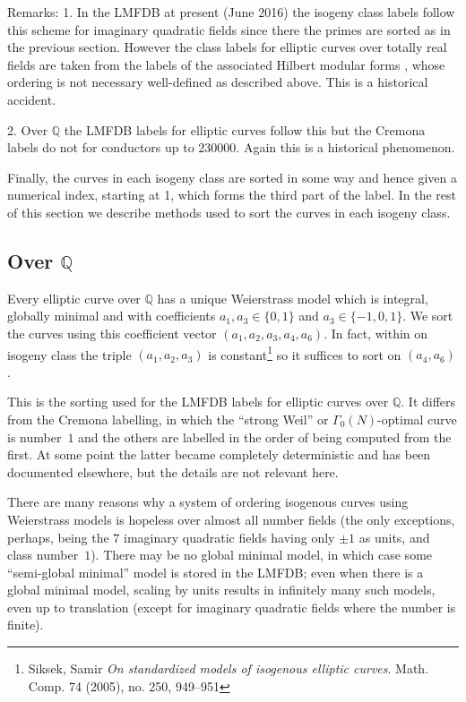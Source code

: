 \documentclass{article}
\def\Q{{\mathbb Q}}
\begin{document}
Remarks: 1. In the LMFDB at present (June 2016) the isogeny class
labels follow this scheme for imaginary quadratic fields since there
the primes are sorted as in the previous section.  However the class
labels for elliptic curves over totally real fields are taken from the
labels of the associated Hilbert modular forms , whose ordering is not
necessary well-defined as described above.  This is a historical
accident.

2. Over $\Q$ the LMFDB labels for elliptic curves follow this but the
Cremona labels do not for conductors up to $230000$.  Again this is a
historical phenomenon.

Finally, the curves in each isogeny class are sorted in some way and
hence given a numerical index, starting at 1, which forms the third
part of the label.  In the rest of this section we describe methods
used to sort the curves in each isogeny class.

\subsection{Over $\Q$}

Every elliptic curve over $\Q$ has a unique Weierstrass model which is
integral, globally minimal and with coefficients $a_1,a_3\in\{0,1\}$
and $a_3\in\{-1,0,1\}$.  We sort the curves using this coefficient
vector $(a_1,a_2,a_3,a_4,a_6)$.  In fact, within on isogeny class the
triple $(a_1,a_2,a_3)$ is constant\footnote{Siksek, Samir \textit{On
    standardized models of isogenous elliptic curves}. Math. Comp. 74
  (2005), no. 250, 949–951} so it suffices to sort on $(a_4,a_6)$.

This is the sorting used for the LMFDB labels for elliptic curves over
$\Q$.  It differs from the Cremona labelling, in which the ``strong
Weil'' or $\Gamma_0(N)$-optimal curve is number~$1$ and the others are
labelled in the order of being computed from the first.  At some point
the latter became completely deterministic and has been documented
elsewhere, but the details are not relevant here.

There are many reasons why a system of ordering isogenous curves using
Weierstrass models is hopeless over almost all number fields (the only
exceptions, perhaps, being the $7$ imaginary quadratic fields having
only $\pm1$ as units, and class number~$1$).  There may be no global
minimal model, in which case some ``semi-global minimal'' model is
stored in the LMFDB; even when there is a global minimal model,
scaling by units results in infinitely many such models, even up to
translation (except for imaginary quadratic fields where the number is
finite).
\end{document}
